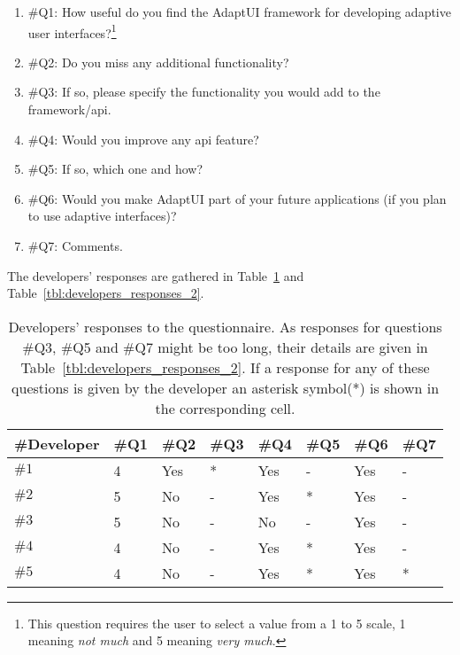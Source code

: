 \begin{enumerate}
 \item \#Q1: How useful do you find the AdaptUI framework for developing adaptive 
 user interfaces?\footnote{This question requires the user to select a value from
 a 1 to 5 scale, 1 meaning \textit{not much} and 5 meaning \textit{very much}.}
 \item \#Q2: Do you miss any additional functionality?
 \item \#Q3: If so, please specify the functionality you would add to the 
 framework/\ac{api}.
 \item \#Q4: Would you improve any \ac{api} feature?
 \item \#Q5: If so, which one and how?
 \item \#Q6: Would you make AdaptUI part of your future applications (if you 
 plan to use adaptive interfaces)?
 \item \#Q7: Comments.
\end{enumerate}

The developers' responses are gathered in Table~\ref{tbl:developers_responses}
and Table~\ref{tbl:developers_responses_2}.

\begin{table}
  \caption{Developers' responses to the questionnaire. As responses for questions 
  \#Q3, \#Q5 and \#Q7 might be too long, their details are given in 
  Table~\ref{tbl:developers_responses_2}. If a response for any of these questions
  is given by the developer an asterisk symbol(*) is shown in the corresponding
  cell.}
 \label{tbl:developers_responses}
\footnotesize
\centering
 \begin{tabular}{l l l l l l l l}
  \hline 
  \textbf{\#Developer} 	& \textbf{\#Q1} & \textbf{\#Q2} & \textbf{\#Q3} & \textbf{\#Q4} & \textbf{\#Q5} & \textbf{\#Q6} & \textbf{\#Q7} \\
  \hline
  $\#1$			& 4		& Yes		& * 		& Yes	 	& - 		& Yes 		& - \\
  $\#2$			& 5		& No		& - 		& Yes		& *		& Yes		& - \\
  $\#3$			& 5		& No		& - 		& No		& -		& Yes		& - \\
  $\#4$			& 4		& No		& - 		& Yes		& *		& Yes		& - \\
  $\#5$			& 4		& No		& - 		& Yes		& *		& Yes		& * \\
  \hline
\end{tabular}
\end{table}

